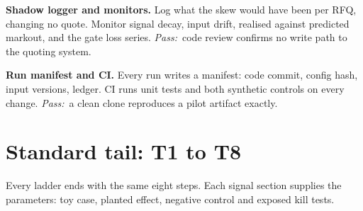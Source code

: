 \documentclass[11pt,letterpaper]{article}
\makeatletter
\newcommand*{\twodigit}[1]{\expandafter\@twodigit\csname c@#1\endcsname}
\newcommand*{\@twodigit}[1]{\ifnum#1<10 0\fi\number#1}
\newcommand{\stepname}[1]{\textbf{#1.}}
\newcommand{\Pass}{\textit{Pass:}~}
\makeatother
\begin{document}
\begin{ladder}[label=\textbf{F\twodigit*}]
\item \stepname{Shadow logger and monitors} Log what the skew would have been per RFQ, changing no quote. Monitor signal decay, input drift, realised against predicted markout, and the gate loss series. \Pass code review confirms no write path to the quoting system.
\item \stepname{Run manifest and CI} Every run writes a manifest: code commit, config hash, input versions, ledger. CI runs unit tests and both synthetic controls on every change. \Pass a clean clone reproduces a pilot artifact exactly.
\end{ladder}

\section{Standard tail: T1 to T8}
\label{sec:tail}
Every ladder ends with the same eight steps. Each signal section supplies the parameters: toy case, planted effect, negative control and exposed kill tests.
\end{document}
